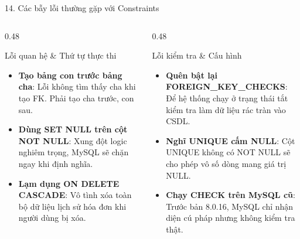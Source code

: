 \documentclass[aspectratio=169,11pt]{beamer}
\begin{document}
\begin{frame}{14. Các bẫy lỗi thường gặp với Constraints}
\begin{columns}[t]
  \begin{column}{0.48\textwidth}
    \begin{alertblock}{Lỗi quan hệ \& Thứ tự thực thi}
      \begin{itemize}\setlength{\itemsep}{2pt}
        \item \textbf{Tạo bảng con trước bảng cha}: Lỗi không tìm thấy cha khi tạo FK. Phải tạo cha trước, con sau.
        \item \textbf{Dùng SET NULL trên cột NOT NULL}: Xung đột logic nghiêm trọng, MySQL sẽ chặn ngay khi định nghĩa.
        \item \textbf{Lạm dụng ON DELETE CASCADE}: Vô tình xóa toàn bộ dữ liệu lịch sử hóa đơn khi người dùng bị xóa.
      \end{itemize}
    \end{alertblock}
  \end{column}
  \begin{column}{0.48\textwidth}
    \begin{alertblock}{Lỗi kiểm tra \& Cấu hình}
      \begin{itemize}\setlength{\itemsep}{2pt}
        \item \textbf{Quên bật lại FOREIGN\_KEY\_CHECKS}: Để hệ thống chạy ở trạng thái tắt kiểm tra làm dữ liệu rác tràn vào CSDL.
        \item \textbf{Nghĩ UNIQUE cấm NULL}: Cột UNIQUE không có NOT NULL sẽ cho phép vô số dòng mang giá trị NULL.
        \item \textbf{Chạy CHECK trên MySQL cũ}: Trước bản 8.0.16, MySQL chỉ nhận diện cú pháp nhưng không kiểm tra thật.
      \end{itemize}
    \end{alertblock}
  \end{column}
\end{columns}
\end{frame}
\end{document}
